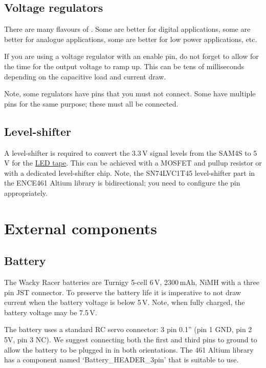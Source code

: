 \subsection{Voltage regulators}\label{voltage-regulators}

There are many flavours of .
Some are better for digital applications, some are better for analogue
applications, some are better for low power applications, etc.

If you are using a voltage regulator with an enable pin, do not forget
to allow for the time for the output voltage to ramp up. This can be
tens of milliseconds depending on the capacitive load and current draw.

Note, some regulators have pins that you must not connect. Some have
multiple pins for the same purpose; these must all be connected.


\subsection{Level-shifter}\label{level-shifter}

A level-shifter is required to convert the 3.3\,V signal levels from
the SAM4S to 5\,V for the \hyperref[LED-tape]{LED tape}.  This can be
achieved with a MOSFET and pullup resistor or with a dedicated
level-shifter chip.  Note, the SN74LVC1T45 level-shifter part in the
ENCE461 Altium library is bidirectional; you need to configure the
 pin appropriately.



\section{External components}

\subsection{Battery}

The Wacky Racer batteries are Turnigy 5-cell 6\,V, 2300\,mAh, NiMH
with a three pin JST connector.  To preserve the battery life it is
imperative to not draw current when the battery voltage is below 5\,V.
Note, when fully charged, the battery voltage may be 7.5\,V.

The battery uses a standard RC servo connector: 3 pin 0.1'' (pin 1
GND, pin 2 5V, pin 3 NC). We suggest connecting both the first and
third pins to ground to allow the battery to be plugged in in both
orientations. The 461 Altium library has a component named
`Battery\_HEADER\_3pin' that is suitable to use.

